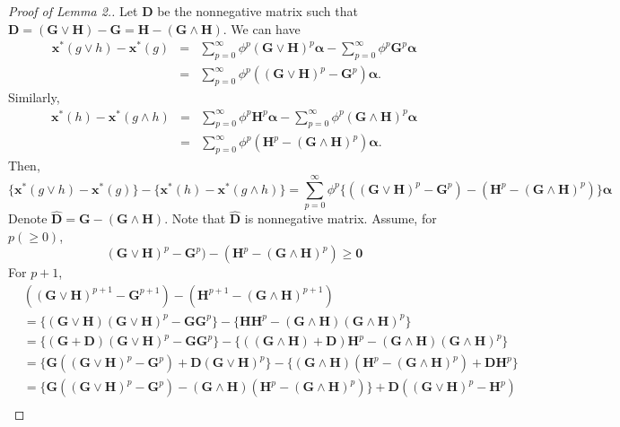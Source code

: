 \documentclass[12pt]{article}
\theoremstyle{definition}
\newcommand{\bm}[1]{\boldsymbol{#1}}
\begin{document}
\begin{proof}[Proof of Lemma 2.]
	Let $\bm{D}$ be the nonnegative matrix such that $\bm{D} = (\bm{G} \vee \bm{H}) - \bm{G} = \bm{H} - (\bm{G} \wedge \bm{H})$.
	We can have
	\begin{eqnarray*}
		\bm{x}^*(g \vee h) - \bm{x}^*(g)
			&=& \sum_{p=0}^{\infty} \phi^p (\bm{G} \vee \bm{H})^p \bm{\alpha} - \sum_{p=0}^{\infty} \phi^p \bm{G}^p \bm{\alpha} \\
			&=& \sum_{p=0}^{\infty} \phi^p ((\bm{G} \vee \bm{H})^p - \bm{G}^p) \bm{\alpha}.
	\end{eqnarray*}
	Similarly,
	\begin{eqnarray*}
		\bm{x}^*(h) - \bm{x}^*(g \wedge h)
			&=& \sum_{p=0}^{\infty} \phi^p \bm{H}^p \bm{\alpha} - \sum_{p=0}^{\infty} \phi^p (\bm{G} \wedge \bm{H})^p \bm{\alpha} \\
			&=& \sum_{p=0}^{\infty} \phi^p (\bm{H}^p - (\bm{G} \wedge \bm{H})^p) \bm{\alpha}.
	\end{eqnarray*}
	Then,
	\begin{equation}
		\label{lemma2}
		\{ \bm{x}^*(g \vee h) - \bm{x}^*(g) \} - \{ \bm{x}^*(h) - \bm{x}^*(g \wedge h) \} = \sum_{p=0}^{\infty} \phi^p \{((\bm{G} \vee \bm{H})^p - \bm{G}^p) - (\bm{H}^p - (\bm{G} \wedge \bm{H})^p)\} \bm{\alpha}
	\end{equation}
	Denote $\bm{\hat{D}} = \bm{G} - (\bm{G} \wedge \bm{H})$.
	Note that $\bm{\hat{D}}$ is nonnegative matrix.
	Assume, for $p (\ge 0)$,
		\[(\bm{G} \vee \bm{H})^{p} - \bm{G}^{p}) - (\bm{H}^{p} - (\bm{G} \wedge \bm{H})^{p}) \ge \bm{0} \]
	For $p + 1$,
	\begin{align*}
		& ((\bm{G} \vee \bm{H})^{p+1} - \bm{G}^{p+1}) - (\bm{H}^{p+1} - (\bm{G} \wedge \bm{H})^{p+1}) \\
			&= \{(\bm{G} \vee \bm{H}) (\bm{G} \vee \bm{H})^p - \bm{G} \bm{G}^p\} - \{\bm{H} \bm{H}^p - (\bm{G} \wedge \bm{H}) (\bm{G} \wedge \bm{H})^p\} \\
			&= \{(\bm{G} + \bm{D}) (\bm{G} \vee \bm{H})^p - \bm{G} \bm{G}^p\} - \{((\bm{G} \wedge \bm{H}) + \bm{D}) \bm{H}^p - (\bm{G} \wedge \bm{H}) (\bm{G} \wedge \bm{H})^p\} \\
			&= \{\bm{G}((\bm{G} \vee \bm{H})^p - \bm{G}^p) + \bm{D} (\bm{G} \vee \bm{H})^p\} - \{(\bm{G} \wedge \bm{H})(\bm{H}^p - (\bm{G} \wedge \bm{H})^p) + \bm{D} \bm{H}^p\} \\
			&= \{\bm{G}((\bm{G} \vee \bm{H})^p - \bm{G}^p) - (\bm{G} \wedge \bm{H})(\bm{H}^p - (\bm{G} \wedge \bm{H})^p) \} + \bm{D} ((\bm{G} \vee \bm{H})^p - \bm{H}^p) \\

\end{align*}
\end{proof}
\end{document}
